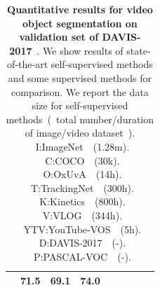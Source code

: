 \documentclass{article}
\begin{document}
\begin{table}[t]
{\begin{tabular}{ccccccccc}
			& 71.5   & 69.1 & 74.0  \\
			\bottomrule
		\end{tabular}
	}
	\captionsetup{font=footnotesize}
	\caption{\textbf{Quantitative results for video object segmentation on validation set of DAVIS-2017}~\cite{pont20172017}. We show results of state-of-the-art self-supervised methods and some supervised methods for comparison. We report the data size for self-supervised methods~(~total number/duration of image/video dataset~). ~I:ImageNet~\cite{deng2009imagenet}~(1.28m). ~C:COCO~\cite{lin2014microsoft}~(30k). ~O:OxUvA~\cite{valmadre2018long}~(14h). ~T:TrackingNet~\cite{muller2018trackingnet}~(300h). ~K:Kinetics~\cite{carreira2017quo}~(800h). ~V:VLOG~\cite{fouhey2018lifestyle}~(344h). ~YTV:YouTube-VOS~\cite{xu2018youtube}~(5h). ~D:DAVIS-2017~\cite{pont20172017}~(-). ~P:PASCAL-VOC~\cite{everingham2015pascal}~(-).}
	\label{table:sota}
	\vspace{-20pt}
\end{table}
\end{document}
